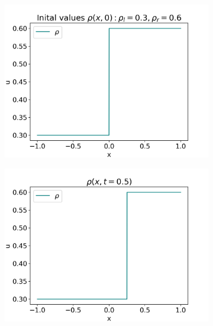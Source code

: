 \documentclass[10pt]{article}
\numberwithin{equation}{section}
\begin{document}
\begin{figure}
     \centering
     \begin{subfigure}[b]{0.3\textwidth}
         \centering
         \includegraphics[width=\textwidth]{Figures/Model/ForwShockIV.png}
     \end{subfigure}
     \hfill
     \begin{subfigure}[b]{0.3\textwidth}
         \centering
         \includegraphics[width=\textwidth]{Figures/Model/ForwShockAtTime.png}
     \end{subfigure}
     \hfill

\end{figure}
\end{document}
